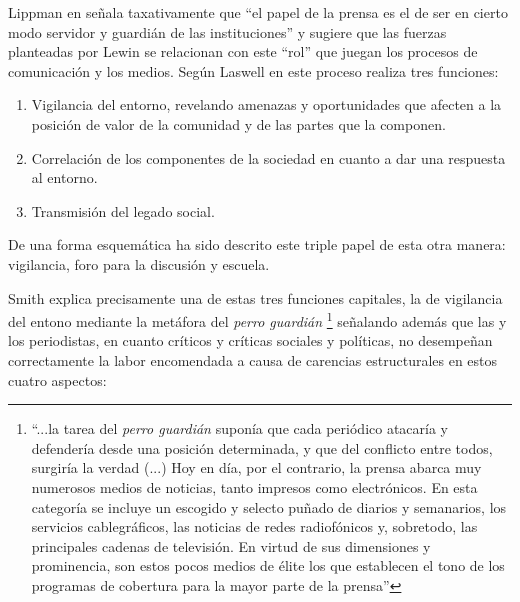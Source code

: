
Lippman en \cite{lippmann1922public} señala taxativamente que ``el papel de la prensa es el de ser en cierto modo servidor y guardián de las instituciones'' y sugiere que las fuerzas planteadas por Lewin se relacionan con este ``rol'' que juegan los procesos de comunicación y los medios. Según Laswell en \cite{Lasswell2007Structure} este proceso realiza tres funciones: 
\begin{enumerate}
\item Vigilancia del entorno, revelando amenazas y oportunidades que afecten a la posición de valor de la comunidad y de las partes que la componen.
\item Correlación de los componentes de la sociedad en cuanto a dar una respuesta al entorno. 
\item Transmisión del legado social. 
\end{enumerate}
De una forma esquemática ha sido descrito este triple papel de esta otra manera: vigilancia, foro para la discusión y escuela.\cite{informacionsociedad} 

Smith \cite{tedsmith} explica precisamente una de estas tres funciones capitales, la de vigilancia del entono mediante la metáfora del \emph{perro guardián} \footnote{ ``...la tarea del \emph{perro guardián} suponía que cada periódico atacaría y defendería desde una posición determinada, y que del conflicto entre todos, surgiría la verdad (...) Hoy en día, por el contrario, la prensa abarca muy numerosos medios de noticias, tanto impresos como electrónicos. En esta categoría se incluye un escogido y selecto puñado de diarios y semanarios, los servicios cablegráficos, las noticias de redes radiofónicos y, sobretodo, las principales cadenas de televisión. En virtud de sus dimensiones y prominencia, son estos pocos medios de élite los que establecen el tono de los programas de cobertura para la mayor parte de la prensa''} señalando además que las y los periodistas, en cuanto críticos y críticas sociales y políticas, no desempeñan correctamente la labor encomendada a causa de carencias estructurales en estos cuatro aspectos: 

